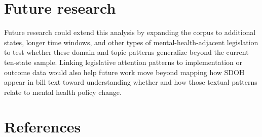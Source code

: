 \documentclass[10pt,twocolumn]{article}
\begin{document}
\section{Future research}\label{future-research}

Future research could extend this analysis by expanding the corpus to
additional states, longer time windows, and other types of
mental-health-adjacent legislation to test whether these domain and
topic patterns generalize beyond the current ten-state sample. Linking
legislative attention patterns to implementation or outcome data would
also help future work move beyond mapping how SDOH appear in bill text
toward understanding whether and how those textual patterns relate to
mental health policy change.

\section{References}\label{references}
\end{document}
